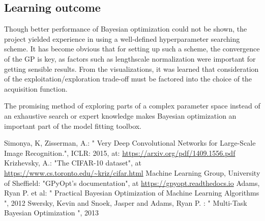\documentclass[12pt,fleqn]{article}
\begin{document}
\begin{multicols}{2}
\section{Learning outcome}

Though better performance of Bayesian optimization could not be shown, the project yielded experience in using a well-defined hyperparameter searching scheme. It has become obvious that for setting up such a scheme, the convergence of the GP is key, as factors such as lengthscale normalization were important for getting sensible results. From the visualizations, it was learned that consideration of the exploitation/exploration trade-off must be factored into the choice of the acquisition function.

The promising method of exploring parts of a complex parameter space instead of an exhaustive search or expert knowledge makes Bayesian optimization an important part of the model fitting toolbox.


\end{multicols}

\begin{thebibliography}{9}
	 Simonya, K, Zisserman, A.: " Very Deep Convolutional Networks for Large-Scale Image Recognition.", ICLR: 2015, at: \url{https://arxiv.org/pdf/1409.1556.pdf}
	 Krizhevsky, A.: "The CIFAR-10 dataset", at \url{https://www.cs.toronto.edu/~kriz/cifar.html}
	 Machine Learning Group, University of Sheffield: "GPyOpt’s documentation", at \url{https://gpyopt.readthedocs.io}
	 Adams, Ryan P. et al: " Practical Bayesian Optimization of Machine Learning Algorithms ", 2012
	 Swersky, Kevin and Snoek, Jasper and Adams, Ryan P. : " Multi-Task Bayesian Optimization ", 2013
\end{thebibliography}
\end{document}
